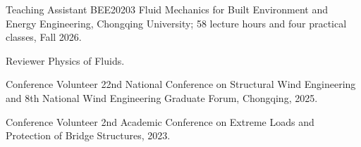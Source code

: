 
\begin{cvskills}
  \cvskill
    {Teaching Assistant}
    {BEE20203 Fluid Mechanics for Built Environment and Energy Engineering, Chongqing University; 58 lecture hours and four practical classes, Fall 2026. 
    }

  \cvskill
    {Reviewer}
    {Physics of Fluids.}

  \cvskill
    {Conference Volunteer}
    {22nd National Conference on Structural Wind Engineering and 8th National Wind Engineering Graduate Forum, Chongqing, 2025. 
    }

  \cvskill
    {Conference Volunteer}
    {2nd Academic Conference on Extreme Loads and Protection of Bridge Structures, 2023. 
    }
\end{cvskills}